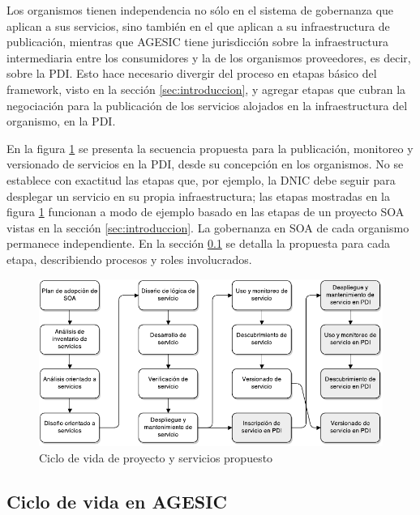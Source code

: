 \documentclass[11pt]{article}
\begin{document}
			Los organismos tienen independencia no sólo en el sistema de gobernanza que aplican a sus servicios, sino también en el que aplican a su infraestructura de publicación, mientras que AGESIC tiene jurisdicción sobre la infraestructura intermediaria entre los consumidores y la de los organismos proveedores, es decir, sobre la PDI. Esto hace necesario divergir del proceso en etapas básico del framework, visto en la sección \ref{sec:introduccion}, y agregar etapas que cubran la negociación para la publicación de los servicios alojados en la infraestructura del organismo, en la PDI.

			En la figura \ref{imagen:ciclo_de_vida_propuesta} se presenta la secuencia propuesta para la publicación, monitoreo y versionado de servicios en la PDI, desde su concepción en los organismos. No se establece con exactitud las etapas que, por ejemplo, la DNIC debe seguir para desplegar un servicio en su propia infraestructura; las etapas mostradas en la figura \ref{imagen:ciclo_de_vida_propuesta} funcionan a modo de ejemplo basado en las etapas de un proyecto SOA vistas en la sección \ref{sec:introduccion}. La gobernanza en SOA de cada organismo permanece independiente. En la sección \ref{sec:ciclo_de_vida_en_agesic} se detalla la propuesta para cada etapa, describiendo procesos y roles involucrados.

			\begin{figure}[h]
				\centering
				\includegraphics[width=\linewidth]{ciclo_de_vida_propuesta}
				\caption{Ciclo de vida de proyecto y servicios propuesto}
				\label{imagen:ciclo_de_vida_propuesta}
			\end{figure}

		\subsection{Ciclo de vida en AGESIC}
			\label{sec:ciclo_de_vida_en_agesic}
\end{document}
